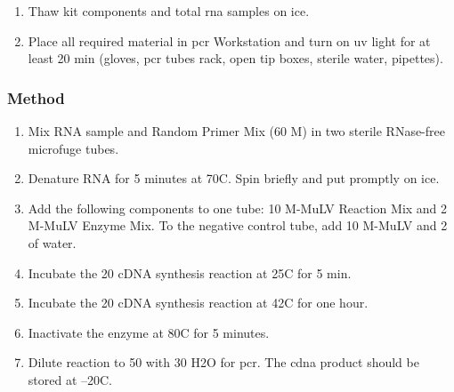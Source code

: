 \begin{enumerate}
\item Thaw kit components and total \gls{rna} samples on ice.
\item Place all required material in \gls{pcr} Workstation and turn on \gls{uv} light for at least 20 min (gloves, \gls{pcr} tubes rack, open tip boxes, sterile water, pipettes).
\end{enumerate}

\subsubsection{Method}

\begin{enumerate}
\item Mix RNA sample and Random Primer Mix (60 \textmu M) in two sterile RNase-free microfuge tubes.
\item Denature RNA for 5 minutes at 70\degree C. Spin briefly and put promptly on ice. 
\item Add the following components to one tube: 10 \uL M-MuLV Reaction Mix and 2 \uL M-MuLV Enzyme Mix. To the negative control tube, add 10 \uL M-MuLV and 2 \uL of water.
\item  Incubate the 20 \uL cDNA synthesis reaction at 25\degree C for 5 min.
\item Incubate the 20 \uL cDNA synthesis reaction at 42\degree C for one hour.
\item Inactivate the enzyme at 80\degree C for 5 minutes. 
\item Dilute reaction to 50 \uL with 30 \uL H2O for \gls{pcr}. The \gls{cdna} product should be stored at –20\degree C. 
\end{enumerate}


